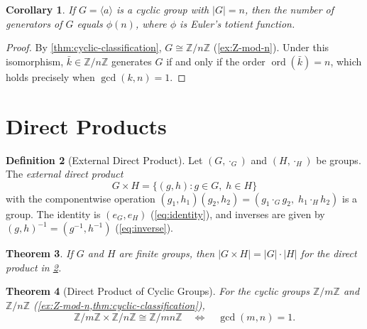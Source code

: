 \documentclass[12pt,a4paper]{article}
\theoremstyle{definition}
\newtheorem{definition}{Definition}[section]
\theoremstyle{plain}
\newtheorem{theorem}[definition]{Theorem}
\newtheorem{corollary}[definition]{Corollary}
\theoremstyle{remark}
\newcommand{\Z}{\mathbb{Z}}
\newcommand{\ord}{\operatorname{ord}}
\begin{document}
\begin{corollary}\label{cor:euler-phi}
If $G = \langle a \rangle$ is a cyclic group with $|G| = n$, then the
number of generators of $G$ equals $\phi(n)$, where $\phi$ is Euler's totient function.
\end{corollary}

\begin{proof}
By \cref{thm:cyclic-classification}, $G \cong \Z/n\Z$ (\cref{ex:Z-mod-n}).
Under this isomorphism, $\bar{k} \in \Z/n\Z$ generates $G$ if and only if the order
$\ord(\bar{k}) = n$, which holds precisely when $\gcd(k, n) = 1$.
\end{proof}


\section{Direct Products}\label{sec:direct}

\begin{definition}[External Direct Product]\label{def:direct-product}
Let $(G, \cdot_G)$ and $(H, \cdot_H)$ be groups.
The \emph{external direct product}
\begin{equation}\label{eq:direct}
    G \times H = \{(g, h) : g \in G, \; h \in H\}
\end{equation}
with the componentwise operation $(g_1, h_1)(g_2, h_2) = (g_1 \cdot_G g_2, \; h_1 \cdot_H h_2)$
is a group. The identity is $(e_G, e_H)$ (\cref{eq:identity}), and inverses
are given by $(g, h)^{-1} = (g^{-1}, h^{-1})$ (\cref{eq:inverse}).
\end{definition}

\begin{theorem}\label{thm:direct-order}
If $G$ and $H$ are finite groups, then
$|G \times H| = |G| \cdot |H|$ for the direct product in \cref{def:direct-product}.
\end{theorem}

\begin{theorem}[Direct Product of Cyclic Groups]\label{thm:Zm-Zn}
For the cyclic groups $\Z/m\Z$ and $\Z/n\Z$ (\cref{ex:Z-mod-n,thm:cyclic-classification}),
\begin{equation}\label{eq:Zm-Zn}
    \Z/m\Z \times \Z/n\Z \cong \Z/mn\Z
    \quad \Longleftrightarrow \quad
    \gcd(m, n) = 1.
\end{equation}
\end{theorem}
\end{document}
